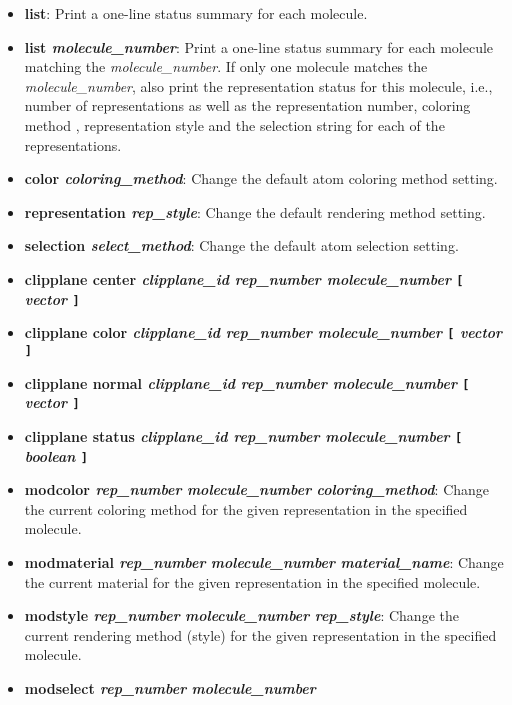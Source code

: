 \begin{itemize}
    \item {\bf  list}: Print a one-line status summary for each molecule.
    \item {\bf  list {\it molecule\_number}}: Print a one-line status summary
for each molecule matching the {\it molecule\_number}. If only one 
molecule matches the {\it molecule\_number}, also print the representation
status for this molecule, i.e., number of representations as well as
the representation number, coloring method
, representation style
and the selection string for each of the representations.
    \item {\bf  color {\it coloring\_method}}: Change the default atom coloring method  setting.
    \item {\bf  representation {\it rep\_style}}: Change the default rendering
method setting.
    \item {\bf  selection {\it select\_method}}: Change the default atom selection  setting.
    \item {\bf  clipplane center {\it clipplane\_id rep\_number molecule\_number } {\tt [} {\it vector} {\tt ]}}
    \item {\bf  clipplane color {\it clipplane\_id rep\_number molecule\_number } {\tt [} {\it  vector} {\tt ]}}
    \item {\bf  clipplane normal {\it clipplane\_id rep\_number molecule\_number } {\tt [} {\it vector} {\tt ]}}
    \item {\bf  clipplane status {\it clipplane\_id rep\_number molecule\_number } {\tt [} {\it boolean} {\tt ]}}
    \item {\bf  modcolor {\it rep\_number} {\it molecule\_number} {\it coloring\_method}}: 
Change the current coloring method for the given
representation in the specified molecule.
    \item {\bf  modmaterial {\it rep\_number} {\it molecule\_number} {\it material\_name}}:
Change the current material for the given representation in the specified 
molecule.
    \item {\bf  modstyle {\it rep\_number} {\it molecule\_number} {\it rep\_style}}: 
Change the current rendering method (style) for the given
representation in the specified molecule.
    \item {\bf  modselect {\it rep\_number} {\it molecule\_number} {\it
}}
\end{itemize}
